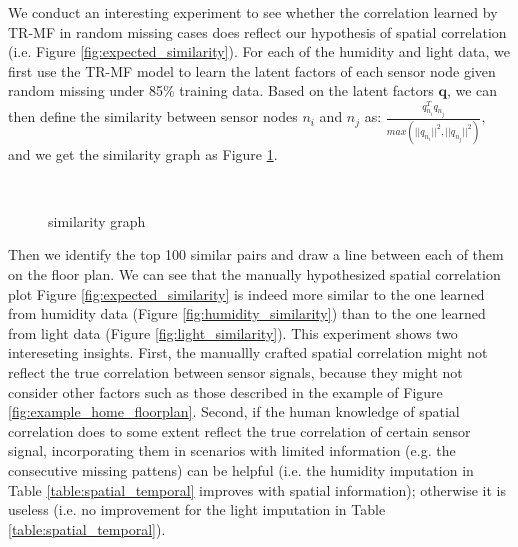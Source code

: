 We conduct an interesting experiment to see whether the correlation learned by TR-MF in random missing cases does reflect our hypothesis of spatial correlation (i.e. Figure \ref{fig:expected_similarity}). For each of the humidity and light data, we first use the TR-MF model to learn the latent factors of each sensor node given random missing under 85\% training data. Based on the latent factors $\mathbf{q}$, we can then define the similarity between sensor nodes $n_i$ and $n_j$ as:
$\frac{q_{n_i}^T q_{n_j}}{max(||q_{n_i}||^2, ||q_{n_j}||^2)},$
and we get the similarity graph as Figure \ref{fig:similarity}.
\begin{figure}[ftbp]
\centering
{}\\
\hspace{0in}
\caption{similarity graph}
\label{fig:similarity}
\end{figure}

Then we identify the top 100 similar pairs and draw a line between each of them on the floor plan. We can see that the manually hypothesized spatial correlation plot Figure \ref{fig:expected_similarity} is indeed more similar to the one learned from humidity data (Figure \ref{fig:humidity_similarity}) than to the one learned from light data (Figure \ref{fig:light_similarity}). This experiment shows two intereseting insights. First, the manuallly crafted spatial correlation might not reflect the true correlation between sensor signals, because they might not consider other factors such as those described in the example of Figure \ref{fig:example_home_floorplan}. Second, if the human knowledge of spatial correlation does to some extent reflect the true correlation of certain sensor signal, incorporating them in scenarios with limited information (e.g. the consecutive missing pattens) can be helpful (i.e. the humidity imputation in Table \ref{table:spatial_temporal} improves with spatial information); otherwise it is useless (i.e. no improvement for the light imputation in Table \ref{table:spatial_temporal}).
